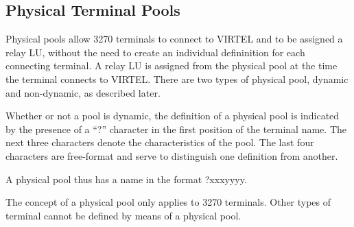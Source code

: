 \documentclass[letterpaper,10pt,english]{sphinxmanual}
\begin{document}
\subsection{Physical Terminal Pools}
\label{\detokenize{connectivity_guide:physical-terminal-pools}}\label{\detokenize{connectivity_guide:index-139}}
Physical pools allow 3270 terminals to connect to VIRTEL and to be assigned a relay LU, without the need to create an individual defininition for each connecting terminal. A relay LU is assigned from the physical pool at the time the terminal connects to VIRTEL. There are two types of physical pool, dynamic and non-dynamic, as described later.

Whether or not a pool is dynamic, the definition of a physical pool is indicated by the presence of a “?” character in the first position of the terminal name. The next three characters denote the characteristics of the pool. The last four characters are free-format and serve to distinguish one definition from another.

A physical pool thus has a name in the format ?xxxyyyy.

The concept of a physical pool only applies to 3270 terminals. Other types of terminal cannot be defined by means of a physical pool.
\end{document}
